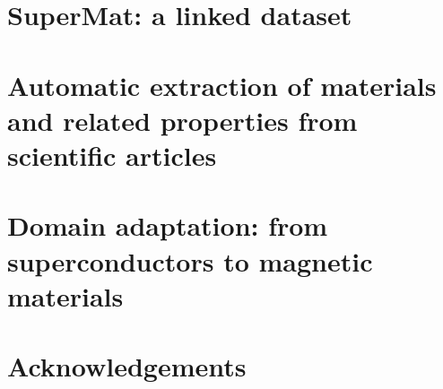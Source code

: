 \documentclass[12pt, a4paper]{report}
\begin{document}
\chapter{SuperMat: a linked dataset }

\chapter{Automatic extraction of materials and related properties from scientific articles}

\chapter{Domain adaptation: from superconductors to magnetic materials}


\chapter*{Acknowledgements}
\newpage



\end{document}
